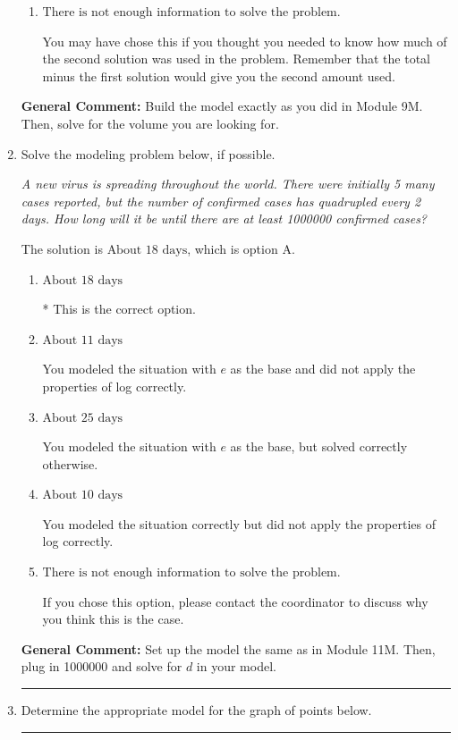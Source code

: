 \documentclass{extbook}[14pt]
\newcommand{\litem}[1]{\item #1

\rule{\textwidth}{0.4pt}}
\begin{document}
\begin{enumerate}
{\begin{enumerate}[label=\Alph*.]
This would be correct if Brittany used equal parts of each solution.
\item \( \text{There is not enough information to solve the problem.} \)

You may have chose this if you thought you needed to know how much of the second solution was used in the problem. Remember that the total minus the first solution would give you the second amount used.
\end{enumerate}

\textbf{General Comment:} Build the model exactly as you did in Module 9M. Then, solve for the volume you are looking for.
}
\litem{
Solve the modeling problem below, if possible.

\begin{center}
    \textit{ A new virus is spreading throughout the world. There were initially 5 many cases reported, but the number of confirmed cases has quadrupled every 2 days. How long will it be until there are at least 1000000 confirmed cases? }
\end{center}


The solution is \( \text{About } 18 \text{ days} \), which is option A.\begin{enumerate}[label=\Alph*.]
\item \( \text{About } 18 \text{ days} \)

* This is the correct option.
\item \( \text{About } 11 \text{ days} \)

You modeled the situation with $e$ as the base and did not apply the properties of log correctly.
\item \( \text{About } 25 \text{ days} \)

You modeled the situation with $e$ as the base, but solved correctly otherwise.
\item \( \text{About } 10 \text{ days} \)

You modeled the situation correctly but did not apply the properties of log correctly.
\item \( \text{There is not enough information to solve the problem.} \)

If you chose this option, please contact the coordinator to discuss why you think this is the case.
\end{enumerate}

\textbf{General Comment:} Set up the model the same as in Module 11M. Then, plug in 1000000 and solve for $d$ in your model.
}
\litem{
Determine the appropriate model for the graph of points below.

}
\end{enumerate}
\end{document}
